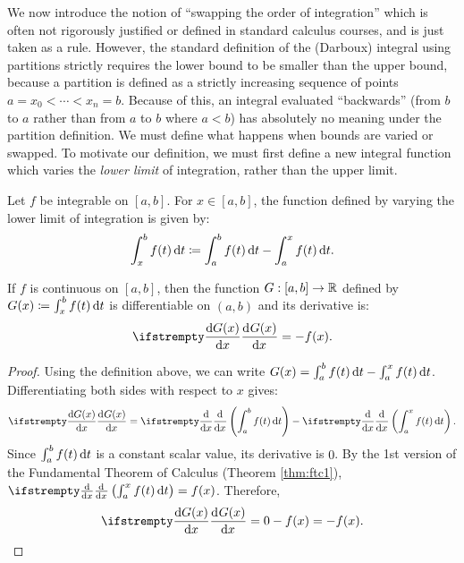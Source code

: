 \documentclass[../analysis1.tex]{subfiles}
\begin{document}
We now introduce the notion of ``swapping the order of integration'' which is often not rigorously justified or defined in standard calculus courses, and is just taken as a rule. However, the standard definition of the (Darboux) integral using partitions strictly requires the lower bound to be smaller than the upper bound, because a partition is defined as a strictly increasing sequence of points $a=x_0<\cdots<x_n=b$. Because of this, an integral evaluated ``backwards'' (from $b$ to $a$ rather than from $a$ to $b$ where $a<b$) has absolutely no meaning under the partition definition. We must define what happens when bounds are varied or swapped. To motivate our definition, we must first define a new integral function which varies the \textit{lower limit} of integration, rather than the upper limit.

\begin{definition}
    \begin{shaded*}
        Let $f$ be integrable on $[a,b]$. For $x \in [a,b]$, the function defined by varying the lower limit of integration is given by:
        \[
            \int_x^b f(t) \d{t} \coloneqq \int_a^b f(t) \d{t} - \int_a^x f(t) \d{t}.
        \]
    \end{shaded*}
\end{definition}

\begin{theorem}
    \begin{shaded*}
        If $f$ is continuous on $[a,b]$, then the function $G:[a,b]\to\mathbb{R}$ defined by $G(x) \coloneqq \int_x^b f(t) \d{t}$ is differentiable on $(a,b)$ and its derivative is:
        \[
            \deriv{G(x)}{x} = -f(x).
        \]
    \end{shaded*}
\end{theorem}

\begin{proof}
    Using the definition above, we can write $G(x) = \int_a^b f(t) \d{t} - \int_a^x f(t) \d{t}$. Differentiating both sides with respect to $x$ gives:
    \[
        \deriv{G(x)}{x} = \deriv{}{x} \left( \int_a^b f(t) \d{t} \right) - \deriv{}{x} \left( \int_a^x f(t) \d{t} \right).
    \]
    Since $\int_a^b f(t) \d{t}$ is a constant scalar value, its derivative is $0$. By the 1st version of the Fundamental Theorem of Calculus (Theorem \ref{thm:ftc1}), $\deriv{}{x} \left( \int_a^x f(t) \d{t} \right) = f(x)$. Therefore, 
    \[
        \deriv{G(x)}{x} = 0 - f(x) = -f(x).
    \]
\end{proof}
\end{document}
